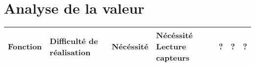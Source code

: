
\section{Analyse de la valeur}

\begin{center}
\begin{longtable}{|m{6cm}|m{17mm}|m{17mm}|m{17mm}|}
\hline
Fonction & Difficulté de réalisation & Nécéssité & Nécéssité\endhead
\hline
Lecture capteurs
& %
?
& %
?
& %
?
\\\hline
\end{longtable}
\end{center}
